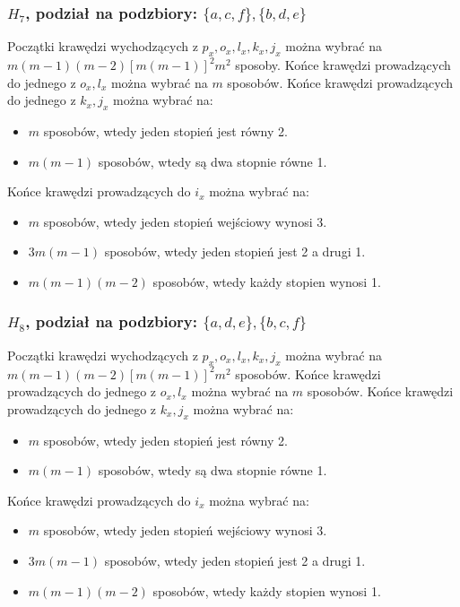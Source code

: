 \documentclass{article}
\begin{document}
\subsubsection{$H_7$, podział na podzbiory: $\{ a,c,f \}, \{ b,d,e \}$}
Początki krawędzi wychodzących z $p_x, o_x, l_x, k_x, j_x$ można wybrać na $m(m-1)(m-2)[m(m-1)]^2m^2$ sposoby. Końce krawędzi prowadzących do jednego z $o_x, l_x$ można wybrać na $m$ sposobów. Końce krawędzi prowadzących do jednego z $k_x,j_x$ można wybrać na:
\begin{itemize}
  \item $m$ sposobów, wtedy jeden stopień jest równy 2.
  \item $m(m-1)$ sposobów, wtedy są dwa stopnie równe 1.
\end{itemize}
Końce krawędzi prowadzących do $i_x$ można wybrać na:
\begin{itemize}
  \item $m$ sposobów, wtedy jeden stopień wejściowy wynosi 3.
  \item $3m(m-1)$ sposobów, wtedy jeden stopień jest 2 a drugi 1.
  \item $m(m-1)(m-2)$ sposobów, wtedy każdy stopien wynosi 1.
\end{itemize}

\subsubsection{$H_8$, podział na podzbiory: $\{ a,d,e \}, \{ b,c,f \}$}
Początki krawędzi wychodzących z $p_x, o_x, l_x, k_x, j_x$ można wybrać na $m(m-1)(m-2)[m(m-1)]^2m^2$ sposobów. Końce krawędzi prowadzących do jednego z $o_x, l_x$ można wybrać na $m$ sposobów. Końce krawędzi prowadzących do jednego z $k_x,j_x$ można wybrać na:
\begin{itemize}
  \item $m$ sposobów, wtedy jeden stopień jest równy 2.
  \item $m(m-1)$ sposobów, wtedy są dwa stopnie równe 1.
\end{itemize}
Końce krawędzi prowadzących do $i_x$ można wybrać na:
\begin{itemize}
  \item $m$ sposobów, wtedy jeden stopień wejściowy wynosi 3.
  \item $3m(m-1)$ sposobów, wtedy jeden stopień jest 2 a drugi 1.
  \item $m(m-1)(m-2)$ sposobów, wtedy każdy stopien wynosi 1.
\end{itemize}
\end{document}
